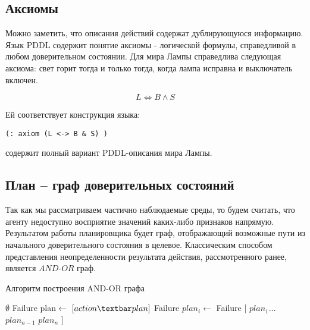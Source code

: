 \subsection{Аксиомы}

Можно заметить, что описания действий содержат дублирующуюся информацию.
Язык PDDL содержит понятие аксиомы - логической формулы, справедливой в
любом доверительном состоянии. Для мира Лампы справедлива следующая
аксиома: свет горит тогда и только тогда, когда лампа исправна и
выключатель включен.

\begin{equation} L \iff B \land S \end{equation}

Ей соответствует конструкция языка:

\begin{verbatim}
(: axiom (L <-> B & S) )
\end{verbatim}

 содержит полный вариант PDDL-описания мира Лампы.

\subsection{План -- граф доверительных состояний}

Так как мы рассматриваем частично наблюдаемые среды, то будем считать,
что агенту недоступно восприятие значений каких-либо признаков напрямую.
Результатом работы планировщика будет граф, отображающий возможные пути
из начального доверительного состояния в целевое. Классическим способом
представления неопределенности результата действия, рассмотренного
ранее, является $AND$-$OR$ граф.

\begin{algorithm}
  \caption{Алгоритм построения AND-OR графа}
  \begin{algorithmic}
    \State \Return {}
   \EndFunction
     \State \Return $\emptyset$ \EndIf
     \State \Return Failure \EndIf
    \State plan$\gets$ 
     \State \Return $[action \textbar plan]$ \EndIf
    \EndFor
    \State \Return Failure
   \EndFunction
      \State $plan_i \gets$ 
       \State \Return Failure \EndIf
    \EndFor
    \State \Return $[$  $plan_1 \dots$   $plan_{n-1}$ \Else $plan_n$ \EndIf $]$
   \EndFunction
  \end{algorithmic}

\end{algorithm}
